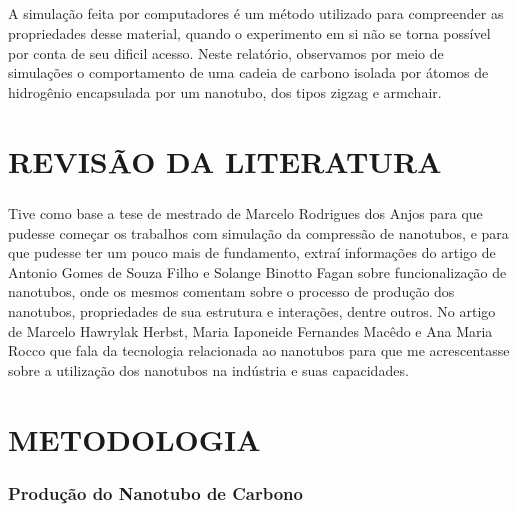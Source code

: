 \documentclass[12pt,a4paper]{report}
\begin{document}
\paragraph{}  A simulação feita por computadores é um método utilizado para compreender as propriedades desse material, quando o experimento em si não se torna possível por conta de seu dificil acesso. Neste relatório, observamos por meio de simulações o comportamento de uma cadeia de carbono isolada por átomos de hidrogênio encapsulada por um nanotubo, dos tipos zigzag e armchair.



\chapter*{REVISÃO DA LITERATURA}
\paragraph{}
Tive como base a tese de mestrado de Marcelo Rodrigues dos Anjos para que pudesse começar os trabalhos com simulação da compressão de nanotubos, e para que pudesse ter um pouco mais de fundamento, extraí informações do artigo de Antonio Gomes de Souza Filho e Solange Binotto Fagan sobre funcionalização de nanotubos, onde os mesmos comentam sobre o processo de produção dos nanotubos, propriedades de sua estrutura e interações, dentre outros. No artigo de Marcelo Hawrylak Herbst, Maria Iaponeide Fernandes Macêdo e Ana Maria Rocco que fala da tecnologia relacionada ao nanotubos para que me acrescentasse sobre a utilização dos nanotubos na indústria e suas capacidades.


\chapter*{METODOLOGIA}
\subsection*{Produção do Nanotubo de Carbono}
\end{document}
